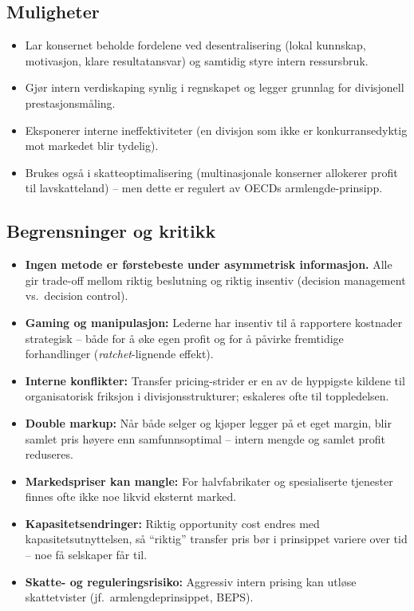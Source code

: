 \subsection*{Muligheter}
\begin{itemize}
\item Lar konsernet beholde fordelene ved desentralisering (lokal kunnskap, motivasjon, klare resultatansvar) og samtidig styre intern ressursbruk.
\item Gjør intern verdiskaping synlig i regnskapet og legger grunnlag for divisjonell prestasjonsmåling.
\item Eksponerer interne ineffektiviteter (en divisjon som ikke er konkurransedyktig mot markedet blir tydelig).
\item Brukes også i skatte\-optimalisering (multinasjonale konserner allokerer profit til lavskatteland) -- men dette er regulert av OECDs armlengde-prinsipp.
\end{itemize}

\subsection*{Begrensninger og kritikk}
\begin{itemize}
\item \textbf{Ingen metode er førstebeste under asymmetrisk informasjon.} Alle gir trade-off mellom riktig beslutning og riktig insentiv (decision management vs.\ decision control).
\item \textbf{Gaming og manipulasjon:} Lederne har insentiv til å rapportere kostnader strategisk -- både for å øke egen profit og for å påvirke fremtidige forhandlinger (\emph{ratchet}-lignende effekt).
\item \textbf{Interne konflikter:} Transfer pricing-strider er en av de hyppigste kildene til organisatorisk friksjon i divisjonsstrukturer; eskaleres ofte til toppledelsen.
\item \textbf{Double markup:} Når både selger og kjøper legger på et eget margin, blir samlet pris høyere enn samfunnsoptimal -- intern mengde og samlet profit reduseres.
\item \textbf{Markedspriser kan mangle:} For halvfabrikater og spesialiserte tjenester finnes ofte ikke noe likvid eksternt marked.
\item \textbf{Kapasitetsendringer:} Riktig opportunity cost endres med kapasitetsutnyttelsen, så ``riktig'' transfer pris bør i prinsippet variere over tid -- noe få selskaper får til.
\item \textbf{Skatte- og reguleringsrisiko:} Aggressiv intern prising kan utløse skattetvister (jf.\ armlengdeprinsippet, BEPS).
\end{itemize}

